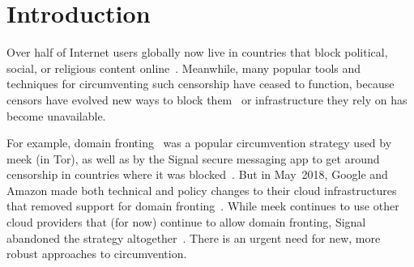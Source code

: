 \documentclass[sigconf]{acmart}
\begin{document}


\maketitle


\section{Introduction}

\FigHighLevel



Over half of Internet users globally
now live in countries that block political, social, or religious content
online~\cite{fotn2018}.
Meanwhile, many popular tools and techniques for circumventing such censorship
have ceased to function, because censors have evolved new ways to block them~\cite{ensafi-tor,great-cannon}
or infrastructure they rely on has become unavailable.



For example, domain fronting~\cite{meek} was a popular circumvention
strategy used by meek (in Tor), as well as by the Signal secure messaging app to
get around censorship in countries where it was
blocked~\cite{signal,signal-domain-fronting}.
But in May~2018, Google and Amazon made both technical and policy changes to
their cloud infrastructures that removed support for domain
fronting~\cite{aws-front}. While meek
continues to use other cloud providers that (for now) continue to allow domain
fronting, Signal abandoned the strategy altogether~\cite{signal-back-on-front}.
There is an urgent need for new, more robust approaches to circumvention.

\end{document}
